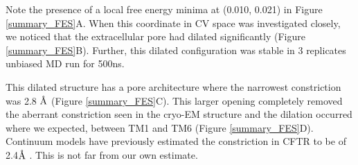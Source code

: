 Note the presence of a local free energy minima at (0.010, 0.021) in Figure \ref{summary_FES}A. When this coordinate in CV space was investigated closely, we noticed that the extracellular pore had dilated significantly (Figure \ref{summary_FES}B). Further, this dilated configuration was stable in 3 replicates unbiased MD run for 500ns. 

This dilated structure has a pore architecture where the narrowest constriction was 2.8 $\textup{\AA}$ (Figure \ref{summary_FES}C). This larger opening completely removed the aberrant constriction seen in the cryo-EM structure and the dilation occurred where we expected, between TM1 and TM6 (Figure \ref{summary_FES}D). Continuum models have previously estimated the constriction in CFTR to be of 2.4$\textup{\AA}$ \cite{jun2016}. This is not far from our own estimate. 

